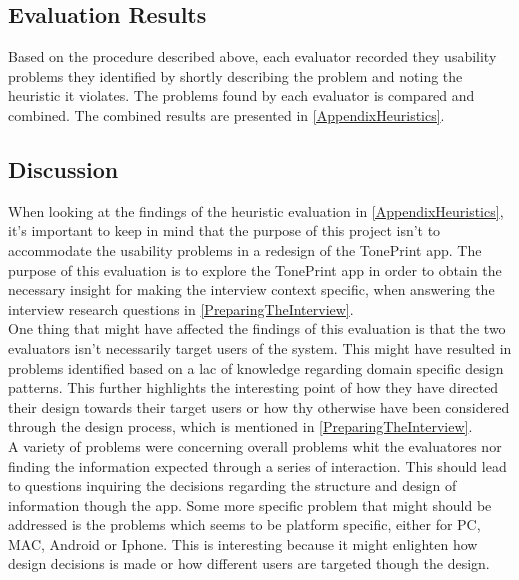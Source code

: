 \subsection{Evaluation Results}
\label{Heuristic_Results}
Based on the procedure described above, each evaluator recorded they usability problems they identified by shortly describing the problem and noting the heuristic it violates. The problems found by each evaluator is compared and combined. The combined results are presented in \autoref{AppendixHeuristics}. 

\subsection{Discussion}
\label{HeuristicDiscussion}
%
When looking at the findings of the heuristic evaluation in \autoref{AppendixHeuristics}, it's important to keep in mind that the purpose of this project isn't to accommodate the usability problems in a redesign of the TonePrint app. The purpose of this evaluation is to explore the TonePrint app in order to obtain the necessary insight for making the interview context specific, when answering the interview research questions in \autoref{PreparingTheInterview}.\\
One thing that might have affected the findings of this evaluation is that the two evaluators isn't necessarily target users of the system. This might have resulted in problems identified based on a lac of knowledge regarding domain specific design patterns. This further highlights the interesting point of how they have directed their design towards their target users or how thy otherwise have been considered through the design process, which is mentioned in \autoref{PreparingTheInterview}.\\
A variety of problems were concerning overall problems whit the evaluatores nor finding the information expected through a series of interaction. This should lead to questions inquiring the decisions regarding the structure and design of information though the app. 
Some more specific problem that might should be addressed is the problems which seems to be platform specific, either for PC, MAC, Android or Iphone. This is interesting because it might enlighten how design decisions is made or how different users are targeted though the design.






